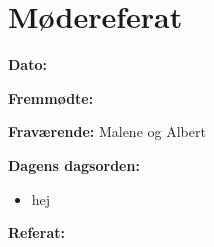 \chapter{Mødereferat}

\textbf{Dato:} 

\textbf{Fremmødte:} 

\textbf{Fraværende:} Malene og Albert

\textbf{Dagens dagsorden:}
\begin{itemize}
	\item hej
\end{itemize}

\textbf{Referat:}